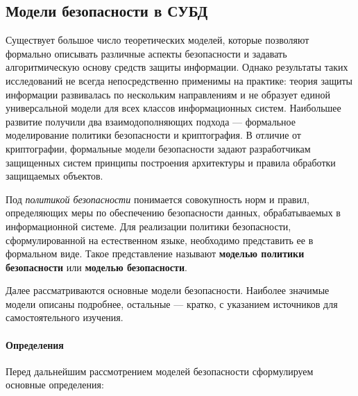 \subsection{Модели безопасности в СУБД}
\label{subsec:security_models}
Существует большое число теоретических моделей, которые позволяют формально описывать различные аспекты безопасности и задавать алгоритмическую основу средств защиты информации. Однако результаты таких исследований не всегда непосредственно применимы на практике: теория защиты информации развивалась по нескольким направлениям и не образует единой универсальной модели для всех классов информационных систем. Наибольшее развитие получили два взаимодополняющих подхода --- формальное моделирование политики безопасности и криптография. В отличие от криптографии, формальные модели безопасности задают разработчикам защищенных систем принципы построения архитектуры и правила обработки защищаемых объектов.

Под \textit{политикой безопасности} понимается совокупность норм и правил, определяющих меры по обеспечению безопасности данных, обрабатываемых в информационной системе. Для реализации политики безопасности, сформулированной на естественном языке, необходимо представить ее в формальном виде. Такое представление называют \textbf{моделью политики безопасности} или \textbf{моделью безопасности}.

Далее рассматриваются основные модели безопасности. Наиболее значимые модели описаны подробнее, остальные --- кратко, с указанием источников для самостоятельного изучения.

\paragraph{Определения}

Перед дальнейшим рассмотрением моделей безопасности сформулируем основные определения:

